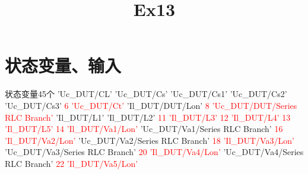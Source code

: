 \documentclass{article}
\title{Ex13}
\begin{document}
\newpage

\section{状态变量、输入}

状态变量45个\newline{}   {       'Uc\_DUT/CL'                   }   {       'Uc\_DUT/Cs'                   }   {       'Uc\_DUT/Cs1'                  }   {       'Uc\_DUT/Cs2'                  }   {       'Uc\_DUT/Cs3'                  }\newline
    \textcolor{red}{6   {       'Uc\_DUT/Ct'                   }}   {       'Il\_DUT/DUT/Lon'              }\newline
    \textcolor{red}{8   {       'Uc\_DUT/DUT/Series RLC Branch'}}   {       'Il\_DUT/L1'                   }  {       'Il\_DUT/L2'                  }\newline
    \textcolor{red}{11  {       'Il\_DUT/L3'                  }}\newline
    \textcolor{red}{12  {       'Il\_DUT/L4'                  }}\newline
    \textcolor{red}{13  {       'Il\_DUT/L5'                  }}\newline
    \textcolor{red}{14  {       'Il\_DUT/Va1/Lon'             }}  {       'Uc\_DUT/Va1/Series RLC Branch'}\newline
    \textcolor{red}{16  {       'Il\_DUT/Va2/Lon'             }}  {       'Uc\_DUT/Va2/Series RLC Branch'}\newline
    \textcolor{red}{18  {       'Il\_DUT/Va3/Lon'             }}  {       'Uc\_DUT/Va3/Series RLC Branch'}\newline
    \textcolor{red}{20  {       'Il\_DUT/Va4/Lon'             }}  {       'Uc\_DUT/Va4/Series RLC Branch'}\newline
    \textcolor{red}{22  {       'Il\_DUT/Va5/Lon'             }}\newline
\end{document}
